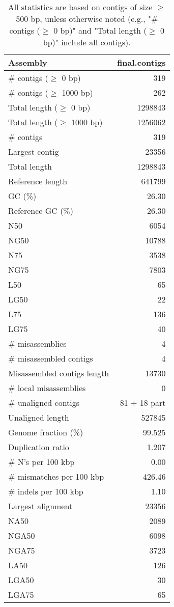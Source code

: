 \documentclass[12pt,a4paper]{article}
\begin{document}
\begin{table}[ht]
\begin{center}
\caption{All statistics are based on contigs of size $\geq$ 500 bp, unless otherwise noted (e.g., "\# contigs ($\geq$ 0 bp)" and "Total length ($\geq$ 0 bp)" include all contigs).}
\begin{tabular}{|l*{1}{|r}|}
\hline
Assembly & final.contigs \\ \hline
\# contigs ($\geq$ 0 bp) & 319 \\ \hline
\# contigs ($\geq$ 1000 bp) & 262 \\ \hline
Total length ($\geq$ 0 bp) & 1298843 \\ \hline
Total length ($\geq$ 1000 bp) & 1256062 \\ \hline
\# contigs & 319 \\ \hline
Largest contig & 23356 \\ \hline
Total length & 1298843 \\ \hline
Reference length & 641799 \\ \hline
GC (\%) & 26.30 \\ \hline
Reference GC (\%) & 26.30 \\ \hline
N50 & 6054 \\ \hline
NG50 & 10788 \\ \hline
N75 & 3538 \\ \hline
NG75 & 7803 \\ \hline
L50 & 65 \\ \hline
LG50 & 22 \\ \hline
L75 & 136 \\ \hline
LG75 & 40 \\ \hline
\# misassemblies & 4 \\ \hline
\# misassembled contigs & 4 \\ \hline
Misassembled contigs length & 13730 \\ \hline
\# local misassemblies & 0 \\ \hline
\# unaligned contigs & 81 + 18 part \\ \hline
Unaligned length & 527845 \\ \hline
Genome fraction (\%) & 99.525 \\ \hline
Duplication ratio & 1.207 \\ \hline
\# N's per 100 kbp & 0.00 \\ \hline
\# mismatches per 100 kbp & 426.46 \\ \hline
\# indels per 100 kbp & 1.10 \\ \hline
Largest alignment & 23356 \\ \hline
NA50 & 2089 \\ \hline
NGA50 & 6098 \\ \hline
NGA75 & 3723 \\ \hline
LA50 & 126 \\ \hline
LGA50 & 30 \\ \hline
LGA75 & 65 \\ \hline
\end{tabular}
\end{center}
\end{table}
\end{document}
